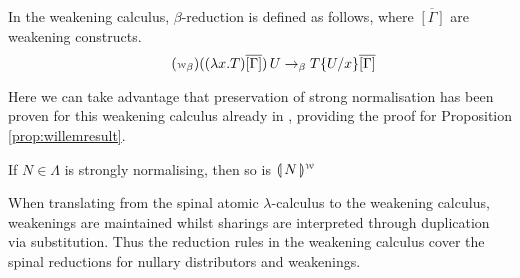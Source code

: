 \documentclass[a4paper,UKenglish,cleveref, autoref]{lipics-v2019}
\newcommand{\abs}[2]{\lambda #1 . #2}
\newcommand{\app}[2]{#1 \, #2}
\newcommand{\sub}[3]{#1 \{ #2 / #3 \}}
\newcommand{\weaksymbol}{\mbox{\tiny $\mathcal{W}$}}
\newcommand{\compweak}[1]{\llparenthesis \, #1 \, \rrparenthesis^{\weaksymbol}}
\begin{document}
\begin{definition}
In the weakening calculus, $\beta$-reduction is defined as follows, where $\overline{[\Gamma]}$ are weakening constructs.
\begin{equation}
\tag{$\weaksymbol_{\beta}$}
	\app{((\abs{x}{T}) \overline{[\Gamma]})}{U} \rightarrow_{\beta} \sub{T}{U}{x} \overline{[\Gamma]} \\
\end{equation}
\end{definition}

\noindent Here we can take advantage that preservation of strong normalisation has been proven for this weakening calculus already in \cite{gundersen2013atomic}, providing the proof for Proposition \ref{prop:willemresult}.

\begin{proposition}
\label{prop:willemresult}
 If $N \in \Lambda$ is strongly normalising, then so is $\compweak{N}$
\end{proposition}

When translating from the spinal atomic $\lambda$-calculus to the weakening calculus, weakenings are maintained whilst sharings are interpreted through duplication via substitution. Thus the reduction rules in the weakening calculus cover the spinal reductions for nullary distributors and weakenings.
\end{document}

